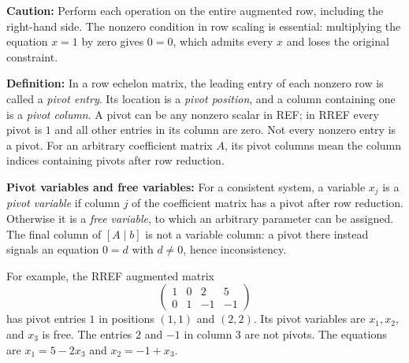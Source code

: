 \documentclass[a4paper,11pt,abstract=true]{scrartcl}
\theoremstyle{dotlessP}
\theoremstyle{dotlessS}
\theoremstyle{remark}
\theoremstyle{definition}
\begin{document}
\begin{remark_box}
\textbf{Caution:} Perform each operation on the entire augmented
row, including the right-hand side. The nonzero condition in row
scaling is essential: multiplying the equation $x=1$ by zero gives
$0=0$, which admits every $x$ and loses the original constraint.
\end{remark_box}

\begin{definition_box}
\textbf{Definition:}
In a row echelon matrix, the leading entry of each nonzero row is
called a \emph{pivot entry}. Its location is a \emph{pivot position},
and a column containing one is a \emph{pivot column}. A pivot can be
any nonzero scalar in REF\@; in RREF every pivot is $1$ and all other
entries in its column are zero. Not every nonzero entry is a pivot.
For an arbitrary coefficient matrix $A$, its pivot columns mean the
column indices containing pivots after row reduction.
\end{definition_box}

\begin{claim_box}
\textbf{Pivot variables and free variables:} For a consistent
system, a variable $x_j$ is a \emph{pivot variable} if column $j$ of
the coefficient matrix has a pivot after row reduction. Otherwise it
is a \emph{free variable}, to which an arbitrary parameter can be
assigned. The final column of $[A\mid b]$ is not a variable column:
a pivot there instead signals an equation $0=d$ with $d\neq0$, hence
inconsistency.

For example, the RREF augmented matrix
\[
\left(\begin{array}{ccc|c}1&0&2&5\\0&1&-1&-1\end{array}\right)
\]
has pivot entries $1$ in positions $(1,1)$ and $(2,2)$. Its pivot
variables are $x_1,x_2$, and $x_3$ is free. The entries $2$ and $-1$
in column $3$ are not pivots. The equations are
$x_1=5-2x_3$ and $x_2=-1+x_3$.
\end{claim_box}
\end{document}
